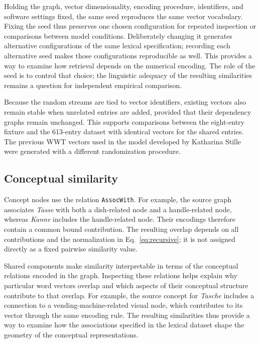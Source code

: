 Holding the graph, vector dimensionality, encoding procedure, identifiers, and software settings fixed, the same seed reproduces the same vector vocabulary. Fixing the seed thus preserves one chosen configuration for repeated inspection or comparisons between model conditions. Deliberately changing it generates alternative configurations of the same lexical specification; recording each alternative seed makes those configurations reproducible as well. This provides a way to examine how retrieval depends on the numerical encoding. The role of the seed is to control that choice; the linguistic adequacy of the resulting similarities remains a question for independent empirical comparison.

Because the random streams are tied to vector identifiers, existing vectors also remain stable when unrelated entries are added, provided that their dependency graphs remain unchanged. This supports comparisons between the eight-entry fixture and the 613-entry dataset with identical vectors for the shared entries. The previous WWT vectors used in the model developed by Katharina Stille were generated with a different randomization procedure.

\subsection{Conceptual similarity}
Concept nodes use the relation \texttt{AssocWith}. For example, the source graph associates \emph{Tasse} with both a dish-related node and a handle-related node, whereas \emph{Kanne} includes the handle-related node. Their encodings therefore contain a common bound contribution. The resulting overlap depends on all contributions and the normalization in Eq.~\eqref{eq:recursive}; it is not assigned directly as a fixed pairwise similarity value.

Shared components make similarity interpretable in terms of the conceptual relations encoded in the graph. Inspecting these relations helps explain why particular word vectors overlap and which aspects of their conceptual structure contribute to that overlap. For example, the source concept for \emph{Tasche} includes a connection to a vending-machine-related visual node, which contributes to its vector through the same encoding rule. The resulting similarities thus provide a way to examine how the associations specified in the lexical dataset shape the geometry of the conceptual representations.

